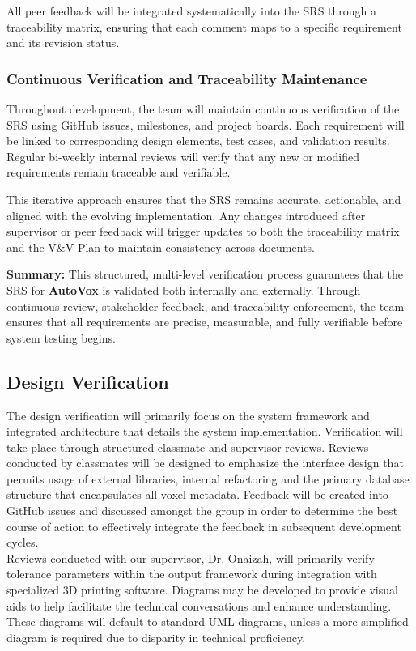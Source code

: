 \documentclass[12pt, titlepage]{article}
\begin{document}
All peer feedback will be integrated systematically into the SRS through a traceability matrix, ensuring that each comment maps to a specific requirement and its revision status.

\subsubsection{Continuous Verification and Traceability Maintenance}

Throughout development, the team will maintain continuous verification of the SRS using GitHub issues, milestones, and project boards. Each requirement will be linked to corresponding design elements, test cases, and validation results. Regular bi-weekly internal reviews will verify that any new or modified requirements remain traceable and verifiable.

This iterative approach ensures that the SRS remains accurate, actionable, and aligned with the evolving implementation. Any changes introduced after supervisor or peer feedback will trigger updates to both the traceability matrix and the V\&V Plan to maintain consistency across documents.

\textbf{Summary:} This structured, multi-level verification process guarantees that the SRS for \textbf{AutoVox} is validated both internally and externally. Through continuous review, stakeholder feedback, and traceability enforcement, the team ensures that all requirements are precise, measurable, and fully verifiable before system testing begins.

\subsection{Design Verification}

The design verification will primarily focus on the system framework and integrated architecture that details the system implementation. Verification will take place through structured classmate and supervisor reviews. Reviews conducted by classmates will be designed to emphasize the interface design that permits usage of external libraries, internal refactoring and the primary database structure that encapsulates all voxel metadata. Feedback will be created into GitHub issues and discussed amongst the group in order to determine the best course of action to effectively integrate the feedback in subsequent development cycles.\\

\noindent Reviews conducted with our supervisor, Dr. Onaizah, will primarily verify tolerance parameters within the output framework during integration with specialized 3D printing software. Diagrams may be developed to provide visual aids to help facilitate the technical conversations and enhance understanding. These diagrams will default to standard UML diagrams, unless a more simplified diagram is required due to disparity in technical proficiency.\\
\end{document}
